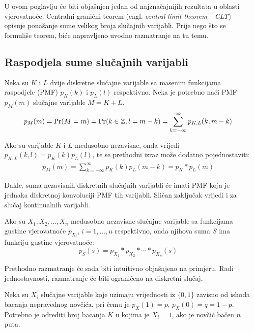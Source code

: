 U ovom poglavlju će biti objašnjen jedan od najznačajnijih rezultata u oblasti
vjerovatnoće. Centralni granični teorem (engl.  \textit{central limit theorem -
CLT}) opisuje ponašanje sume velikog broja slučajnih varijabli. Prije nego što
se formuliše teorem, biće napravljeno uvodno razmatranje na tu temu.

\subsection{Raspodjela sume slučajnih varijabli} \label{sec:clt-suma}

Neka su $K$ i $L$ dvije diskretne slučajne varijable sa masenim funkcijama
raspodjele (PMF) $p_K(k)$ i $p_L(l)$ respektivno. Neka je potrebno naći PMF
$p_M(m)$ slučajne varijable $M=K+L$.
%
\begin{align*}
  p_M(m) = \mathrm{Pr}(M=m) = \mathrm{Pr}(k\in\mathbb{Z}, l=m-k)
  = \sum_{k=-\infty}^{\infty} p_{K,L}(k,m-k)
\end{align*}

Ako su varijable $K$ i $L$ međusobno nezavisne, onda vrijedi $p_{K,L}(k,l) =
p_K(k)p_L(l)$, te se prethodni izraz može dodatno pojednostaviti:
%
\begin{align}
  p_M(m) = \sum_{k=-\infty}^{\infty} p_K(k)p_L(m-k) = p_K * p_L (m)
\end{align}

Dakle, suma nezavisnih diskretnih slučajnih varijabli će imati PMF koja je
jednaka diskretnoj konvoluciji PMF tih varijabli. Sličan zaključak vrijedi i za
slučaj kontinualnih varijabli.

\begin{theorem}

  Ako su $X_1,X_2,...,X_n$ međusobno nezavisne slučajne varijable sa funkcijama
  gustine vjerovatnoće $p_{X_i}$, $i=1,...,n$ respektivno, onda njihova suma $S$
  ima funkciju gustine vjerovatnoće:
  $$p_S(s) = p_{X_1} * p_{X_2} * \cdots * p_{X_n} (s)$$

\end{theorem}

Prethodno razmatranje će sada biti intuitivno objašnjeno na primjeru.  Radi
jednostavnosti, razmatranje će biti ograničeno na diskretni slučaj.

\begin{exmp} \label{ex:novcic}
  
Neka su $X_i$ slučajne varijable koje uzimaju vrijednosti iz $\{0,1\}$ zavisno
od ishoda bacanja nepravednog novčića, pri čemu je $p_X(1)= p$, $p_X(0)=q=1-p$.
Potrebno je odrediti broj bacanja $K$ u kojima je $X_i=1$, ako je novčić bačen
$n$ puta.

\end{exmp}

